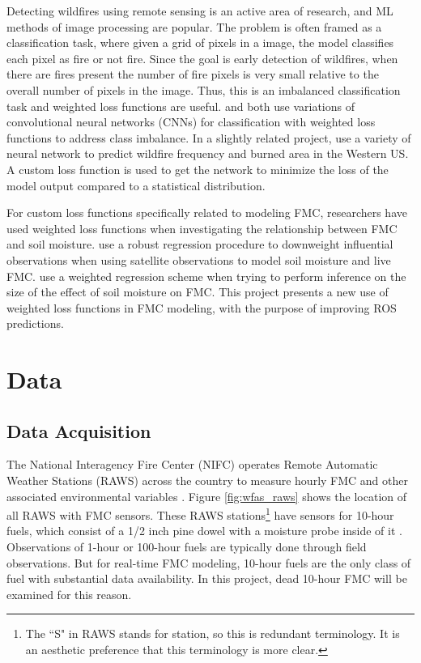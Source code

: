 \documentclass[11pt]{article}%
\begin{document}
Detecting wildfires using remote sensing is an active area of research, and ML methods of image processing are popular. The problem is often framed as a classification task, where given a grid of pixels in a image, the model classifies each pixel as fire or not fire. Since the goal is early detection of wildfires, when there are fires present the number of fire pixels is very small relative to the overall number of pixels in the image. Thus, this is an imbalanced classification task and weighted loss functions are useful. \cite{Yang-2021-PFF} and \cite{Pande-2021-WSF} both use variations of convolutional neural networks (CNNs) for classification with weighted loss functions to address class imbalance. In a slightly related project, \cite{Buch-2022-SML} use a variety of neural network to predict wildfire frequency and burned area in the Western US. A custom loss function is used to get the network to minimize the loss of the model output compared to a  statistical distribution.

For custom loss functions specifically related to modeling FMC, researchers have used weighted loss functions when investigating the relationship between FMC and soil moisture. \cite{Lu-2021-EMS} use a robust regression procedure to downweight influential observations when using satellite observations to model soil moisture and live FMC. \cite{Rakhmatulina-2021-SMI} use a weighted regression scheme when trying to perform inference on the size of the effect of soil moisture on FMC. This project presents a new use of weighted loss functions in FMC modeling, with the purpose of improving ROS predictions.


\section{Data}
\label{sec:data}
\subsection{Data Acquisition}

The National Interagency Fire Center (NIFC) operates Remote Automatic Weather Stations (RAWS) across the country to measure hourly FMC and other associated environmental variables \citep{NIFC-2024-RAW}. Figure \ref{fig:wfas_raws} shows the location of all RAWS with FMC sensors. These RAWS stations\footnote{The ``S" in RAWS stands for station, so this is redundant terminology. It is an aesthetic preference that this terminology is more clear.} have sensors for 10-hour fuels, which consist of a 1/2 inch pine dowel with a moisture probe inside of it \citep{Campbell-2017-RMM}. Observations of 1-hour or 100-hour fuels are typically done through field observations. But for real-time FMC modeling, 10-hour fuels are the only class of fuel with substantial data availability. In this project, dead 10-hour FMC will be examined for this reason.
\end{document}
